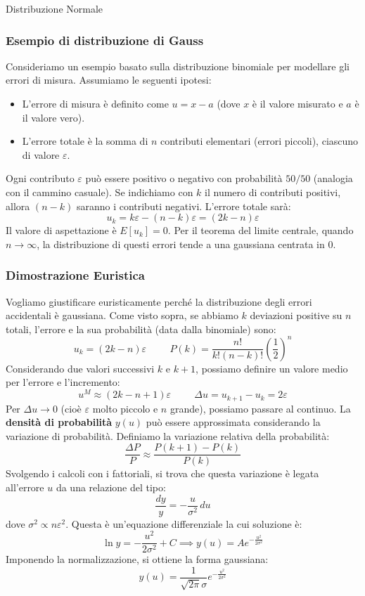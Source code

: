 \documentclass[openany,a4paper,12pt]{book}
\theoremstyle{remark}
\begin{document}
\begin{bressan}{Distribuzione Normale}
\subsubsection*{Esempio di distribuzione di Gauss}
Consideriamo un esempio basato sulla distribuzione binomiale per modellare gli errori di misura.
Assumiamo le seguenti ipotesi:
\begin{itemize}
    \item L'errore di misura è definito come $u = x - a$ (dove $x$ è il valore misurato e $a$ è il valore vero).
    \item L'errore totale è la somma di $n$ contributi elementari (errori piccoli), ciascuno di valore $\varepsilon$.
\end{itemize}
Ogni contributo $\varepsilon$ può essere positivo o negativo con probabilità $50/50$ (analogia con il cammino casuale). Se indichiamo con $k$ il numero di contributi positivi, allora $(n-k)$ saranno i contributi negativi. L'errore totale sarà:
\[
u_k = k\varepsilon - (n-k)\varepsilon = (2k - n)\varepsilon
\]
Il valore di aspettazione è $E[u_k] = 0$. Per il teorema del limite centrale, quando $n \rightarrow \infty$, la distribuzione di questi errori tende a una gaussiana centrata in 0.

\subsubsection*{Dimostrazione Euristica}
Vogliamo giustificare euristicamente perché la distribuzione degli errori accidentali è gaussiana.
Come visto sopra, se abbiamo $k$ deviazioni positive su $n$ totali, l'errore e la sua probabilità (data dalla binomiale) sono:
\[
u_k=(2k-n) \varepsilon \hspace{1cm} P(k)=\frac{n!}{k!(n-k)!} \left(\frac{1}{2}\right)^n
\]
Considerando due valori successivi $k$ e $k+1$, possiamo definire un valore medio per l'errore e l'incremento:
\[
u^M \approx (2k-n+1)\varepsilon \hspace{1cm} \Delta u = u_{k+1} - u_k = 2 \varepsilon
\]
Per $\Delta u \rightarrow 0$ (cioè $\varepsilon$ molto piccolo e $n$ grande), possiamo passare al continuo. La \textbf{densità di probabilità} $y(u)$ può essere approssimata considerando la variazione di probabilità.
Definiamo la variazione relativa della probabilità:
\[
\frac{\Delta P}{P} \approx \frac{P(k+1) - P(k)}{P(k)}
\]
Svolgendo i calcoli con i fattoriali, si trova che questa variazione è legata all'errore $u$ da una relazione del tipo:
\[
\frac{dy}{y} = -\frac{u}{\sigma^2} \, du
\]
dove $\sigma^2 \propto n\varepsilon^2$. Questa è un'equazione differenziale la cui soluzione è:
\[
\ln y = -\frac{u^2}{2\sigma^2} + C \implies y(u) = A e^{-\frac{u^2}{2\sigma^2}}
\]
Imponendo la normalizzazione, si ottiene la forma gaussiana:
\[
y(u)=\frac{1}{\sqrt{2\pi} \sigma}e^{-\frac{u^2}{2 \sigma^2}}
\]


\end{bressan}
\end{document}
